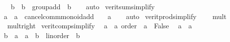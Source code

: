 \begin{isabellebody}
\ \ {\isacartoucheopen}{\isacharminus}{\kern0pt}\ {\isacharparenleft}{\kern0pt}{\isacharminus}{\kern0pt}\ {\isacharparenleft}{\kern0pt}b\ {\isacharcolon}{\kern0pt}{\isacharcolon}{\kern0pt}\ {\isacharprime}{\kern0pt}b\ {\isacharcolon}{\kern0pt}{\isacharcolon}{\kern0pt}\ group{\isacharunderscore}{\kern0pt}add{\isacharparenright}{\kern0pt}{\isacharparenright}{\kern0pt}\ {\isacharequal}{\kern0pt}\ b{\isacartoucheclose}\isanewline
%
\isadelimproof
\ \ %
\endisadelimproof
%
\isatagproof
{}\isamarkupfalse%
\ auto%
\endisatagproof
{\isafoldproof}%
%
\isadelimproof
\isanewline
%
\endisadelimproof
\isanewline
{}\isamarkupfalse%
\ verit{\isacharunderscore}{\kern0pt}sum{\isacharunderscore}{\kern0pt}simplify{\isacharcolon}{\kern0pt}\isanewline
\ \ {\isacartoucheopen}{\isacharparenleft}{\kern0pt}a\ {\isacharcolon}{\kern0pt}{\isacharcolon}{\kern0pt}\ {\isacharprime}{\kern0pt}a\ {\isacharcolon}{\kern0pt}{\isacharcolon}{\kern0pt}\ cancel{\isacharunderscore}{\kern0pt}comm{\isacharunderscore}{\kern0pt}monoid{\isacharunderscore}{\kern0pt}add{\isacharparenright}{\kern0pt}\ {\isacharplus}{\kern0pt}\ {}\ {\isacharequal}{\kern0pt}\ a{\isacartoucheclose}\isanewline
%
\isadelimproof
\ \ %
\endisadelimproof
%
\isatagproof
{}\isamarkupfalse%
\ auto%
\endisatagproof
{\isafoldproof}%
%
\isadelimproof
\isanewline
%
\endisadelimproof
\isanewline
{}\isamarkupfalse%
\ verit{\isacharunderscore}{\kern0pt}prod{\isacharunderscore}{\kern0pt}simplify\ {\isacharequal}{\kern0pt}\isanewline
\isanewline
\ \ \ mult{\isacharunderscore}{\kern0pt}{}\isanewline
\ \ \ mult{\isacharunderscore}{\kern0pt}{}{\isacharunderscore}{\kern0pt}right\isanewline
\isanewline
{}\isamarkupfalse%
\ verit{\isacharunderscore}{\kern0pt}comp{\isacharunderscore}{\kern0pt}simplify{}{\isacharcolon}{\kern0pt}\isanewline
\ \ {\isacartoucheopen}{\isacharparenleft}{\kern0pt}a\ {\isacharcolon}{\kern0pt}{\isacharcolon}{\kern0pt}\ {\isacharprime}{\kern0pt}a\ {\isacharcolon}{\kern0pt}{\isacharcolon}{\kern0pt}order{\isacharparenright}{\kern0pt}\ {\isacharless}{\kern0pt}\ a\ {\isasymlongleftrightarrow}\ False{\isacartoucheclose}\isanewline
\ \ {\isacartoucheopen}a\ {\isasymle}\ a{\isacartoucheclose}\isanewline
\ \ {\isacartoucheopen}{\isasymnot}{\isacharparenleft}{\kern0pt}b{\isacharprime}{\kern0pt}\ {\isasymle}\ a{\isacharprime}{\kern0pt}{\isacharparenright}{\kern0pt}\ {\isasymlongleftrightarrow}\ {\isacharparenleft}{\kern0pt}a{\isacharprime}{\kern0pt}\ {\isacharcolon}{\kern0pt}{\isacharcolon}{\kern0pt}\ {\isacharprime}{\kern0pt}b\ {\isacharcolon}{\kern0pt}{\isacharcolon}{\kern0pt}\ linorder{\isacharparenright}{\kern0pt}\ {\isacharless}{\kern0pt}\ b{\isacharprime}{\kern0pt}{\isacartoucheclose}\isanewline

\end{isabellebody}
